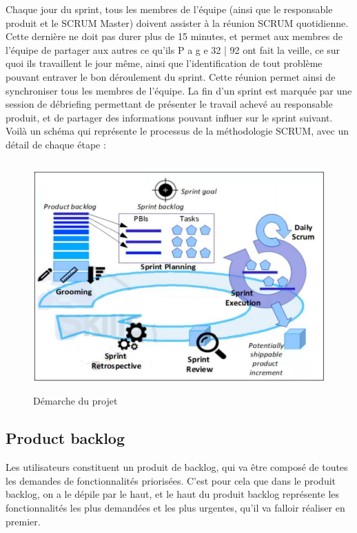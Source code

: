 \documentclass{article}           %
\begin{document}
Chaque jour du sprint, tous les membres de l’\'equipe (ainsi que le responsable produit et le
SCRUM Master) doivent assister à la r\'eunion SCRUM quotidienne. Cette dernière ne doit pas
durer plus de 15 minutes, et permet aux membres de l’\'equipe de partager aux autres ce qu’ils 
P a g e 32 | 92
ont fait la veille, ce sur quoi ils travaillent le jour même, ainsi que l’identification de tout
problème pouvant entraver le bon d\'eroulement du sprint. Cette r\'eunion permet ainsi de
synchroniser tous les membres de l’\'equipe.
La fin d’un sprint est marqu\'ee par une session de d\'ebriefing permettant de pr\'esenter le travail
achev\'e au responsable produit, et de partager des informations pouvant influer sur le sprint
suivant.
Voilà un sch\'ema qui repr\'esente le processus de la m\'ethodologie SCRUM, avec un d\'etail de
chaque \'etape :
\begin{figure}[!h]
	\begin{flushleft}
		\includegraphics[width=450pt, height=250pt]{images/scrum.png}
	\end{flushleft}
	\caption{ D$é$marche du projet}
	\label{ Démarche du projet}
\end{figure}

\subsection{Product backlog}
Les utilisateurs constituent un produit de backlog, qui va être composé de toutes les demandes
de fonctionnalités priorisées. C’est pour cela que dans le produit backlog, on a le dépile par le
haut, et le haut du produit backlog représente les fonctionnalités les plus demandées et les plus
urgentes, qu’il va falloir réaliser en premier. 
\end{document}
